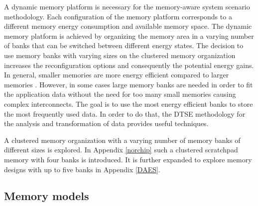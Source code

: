 A dynamic memory platform is necessary for the memory-aware system scenario methodology. 
Each configuration of the memory platform corresponds to a different memory energy consumption and available memory space. 
The dynamic memory platform is achieved by organizing the memory area in a varying number of banks that can be switched between different energy states. 
The decision to use memory banks with varying sizes on the clustered memory organization increases the reconfiguration options and consequently the potential energy gains. 
In general, smaller memories are more energy efficient compared to larger memories \cite{steinke2002assigning}. 
However, in some cases large memory banks are needed in order to fit the application data without the need for too many small memories causing complex interconnects. 
The goal is to use the most energy efficient banks to store the most frequently used data. 
In order to do that, the DTSE methodology for the analysis and transformation of data provides useful techniques.

A clustered memory organization with a varying number of memory banks of different sizes is explored.
In  Appendix \ref{norchip} such a clustered scratchpad memory with four banks is introduced. 
It is further expanded to explore memory designs with up to five banks in Appendix \ref{DAES}.

\subsection{Memory models}

